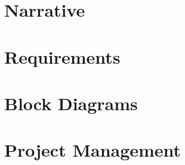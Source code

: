 \documentclass[12pt]{article}
\begin{document}

\tableofcontents
\listoffigures
\listoftables
\pagebreak
{}
%
\section{Narrative}

\section{Requirements}




\section{Block Diagrams}




\section{Project Management}


\end{document}
